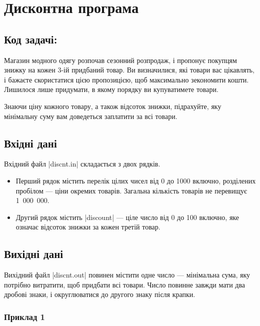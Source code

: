 \documentclass[12pt,a4paper]{article}
\begin{document}
\section*{Дисконтна програма \hfill {}}


\subsection*{Код задачі: }

Магазин модного одягу розпочав сезонний розпродаж, і пропонує покупцям знижку на кожен 3-ій придбаний товар.
Ви визначилися, які товари вас цікавлять, і бажаєте скористатися цією пропозицією, щоб максимально зекономити кошти.
Лишилося лише придумати, в якому порядку ви купуватимете товари.

Знаючи ціну кожного товару, а також відсоток знижки, підрахуйте, яку мінімальну суму вам доведеться заплатити за всі товари.


\subsection*{Вхідні дані}

Вхідний файл |discnt.in| складається з двох рядків.

\begin{itemize}
    \item Перший рядок містить перелік цілих чисел від 0 до 1000 включно, розділених пробілом --- ціни окремих товарів. Загальна кількість товарів не перевищує 1~000~000.
    \item Другий рядок містить |discount| --- ціле число від 0 до 100 включно, яке означає відсоток знижки за кожен третій товар.
\end{itemize}


\subsection*{Вихідні дані}

Вихідний файл |discnt.out| повинен містити одне число --- мінімальна сума, яку потрібно витратити, щоб придбати всі товари. Число повинне завжди мати два дробові знаки, і округлюватися до другого знаку після крапки.


\pagebreak


\subsubsection*{Приклад 1}
\end{document}
